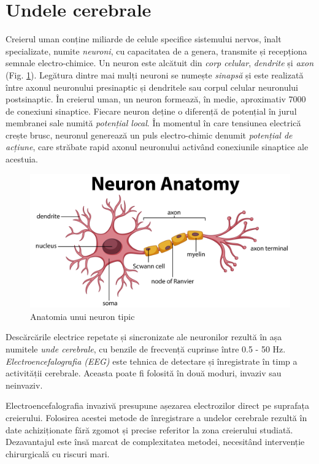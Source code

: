 \section{Undele cerebrale}
Creierul uman conține miliarde de celule specifice sistemului nervos, înalt specializate, numite \textit{neuroni}, cu capacitatea de a genera, transmite și recepționa semnale electro-chimice. Un neuron este alcătuit din \textit{corp celular}, \textit{dendrite} și \textit{axon} (Fig. \ref{fig:neuron-anatomy}). Legătura dintre mai mulți neuroni se numește \textit{sinapsă} și este realizată între axonul neuronului presinaptic și dendritele sau corpul celular neuronului postsinaptic. În creierul uman, un neuron formează, în medie, aproximativ 7000 de conexiuni sinaptice. Fiecare neuron deține o diferență de potențial în jurul membranei sale numită \textit{potențial local}. În momentul în care tensiunea electrică crește brusc, neuronul generează un puls electro-chimic denumit \textit{potențial de acțiune}, care străbate rapid axonul neuronului activând conexiunile sinaptice ale acestuia.
\begin{figure}[ht]
\centering
\includegraphics[width=\textwidth, keepaspectratio]{fig/cap2/neuron-anatomy.jpg}
\caption{Anatomia unui neuron tipic \cite{online:neuron-anatomy}}
\label{fig:neuron-anatomy}
\end{figure}

Descărcările electrice repetate și sincronizate ale neuronilor rezultă în așa numitele \textit{unde cerebrale}, cu benzile de frecvență cuprinse între 0.5 - 50 \si{\hertz}. \textit{Electroencefalografia (EEG)} este tehnica de detectare și înregistrate în timp a activității cerebrale. Aceasta poate fi folosită în două moduri, invaziv sau neinvaziv. 

Electroencefalografia invazivă presupune așezarea electrozilor direct pe suprafața creierului. Folosirea acestei metode de înregistrare a undelor cerebrale rezultă în date achiziționate fără zgomot și precise referitor la zona creierului studiată. Dezavantajul este însă marcat de complexitatea metodei, necesitând intervenție chirurgicală cu riscuri mari.

